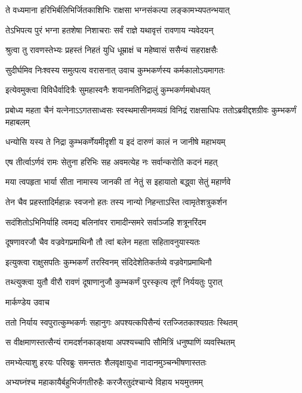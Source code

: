 \twolineshloka
{ते वध्यमाना हरिभिर्बलिभिर्जितकाशिभिः}
{राक्षसा भग्नसंकल्पा लङ्कामभ्यपतन्भयात्}


\twolineshloka
{तेऽभिपत्य पुरं भग्ना हतशेषा निशाचराः}
{सर्वं राज्ञे यथावृत्तं रावणाय न्यवेदयन्}


\twolineshloka
{श्रुत्वा तु रावणस्तेभ्यः प्रहस्तं निहतं युधि}
{धूम्राक्षं च महेष्वासं ससैन्यं सहराक्षसैः}


\twolineshloka
{सुदीर्घमिव निःश्वस्य समुत्पत्य वरासनात्}
{उवाच कुम्भकर्णस्य कर्मकालोऽयमागतः}


\twolineshloka
{इत्येवमुक्त्वा विविधैर्वादित्रैः सुमहास्वनैः}
{शयानमतिनिद्रालुं कुम्भकर्णमबोधयत्}


\threelineshloka
{प्रबोध्य महता चैनं यत्नेनाऽऽगतसाध्वसः}
{स्वस्थमासीनमव्यग्रं विनिद्रं राक्षसाधिपः}
{ततोऽब्रवीद्दशग्रीवः कुम्भकर्णं महाबलम्}


\twolineshloka
{धन्योसि यस्य ते निद्रा कुम्भकर्णेयमीदृशी}
{य इदं दारुणं कालं न जानीषे महाभयम्}


\twolineshloka
{एष तीर्त्वाऽर्णवं रामः सेतुना हरिभिः सह}
{अवमत्येह नः सर्वान्करोति कदनं महत्}


\twolineshloka
{मया त्वपहृता भार्या सीता नामास्य जानकी}
{तां नेतुं स इहायातो बद्ध्वा सेतुं महार्णवे}


\twolineshloka
{तेन चैव प्रहस्तादिर्महान्नः स्वजनो हतः}
{तस्य नान्यो निहन्ताऽस्ति त्वामृतेशत्रुकर्शन}


\twolineshloka
{सदंशितोऽभिनिर्याहि त्वमद्य बलिनांवर}
{रामादीन्समरे सर्वाञ्जहि शत्रूनरिंदम}


\twolineshloka
{दूषणावरजौ चैव वज्रवेगप्रमाथिनौ}
{तौ त्वां बलेन महता सहितावनुयास्यतः}


\twolineshloka
{इत्युक्त्वा राक्षुसपतिः कुम्भकर्णं तरस्विनम्}
{संदिदेशेतिकर्तव्ये वज्रवेगप्रमाथिनौ}


\twolineshloka
{तथ्त्युक्त्वा युतौ वीरौ रावणं दूषाणानुजौ}
{कुम्भकर्णं पुरस्कृत्य तूर्णं निर्ययतुः पुरात्}


\twolineshloka
{मार्कण्डेय उवाच}
{}


\twolineshloka
{ततो निर्याय स्वपुरात्कुम्भकर्णः सहानुगः}
{अपश्यत्कपिसैन्यं रतज्जितकाश्यग्रतः स्थितम्}


\twolineshloka
{स वीक्षमाणस्तत्सैन्यं रामदर्शनकाङ्क्षया}
{अपश्यच्चापि सौमित्रिं धनुष्पाणिं व्यवस्थितम्}


\twolineshloka
{तमभ्येत्याशु हरयः परिवब्रुः समन्ततः}
{शैलवृक्षायुधा नादानमुञ्चन्भीषणास्ततः}


\twolineshloka
{अभ्यघ्नंश्च महाकायैर्बहुभिर्जगतीरुहैः}
{करजैरतुदंश्चान्ये विहाय भयमुत्तमम्}


